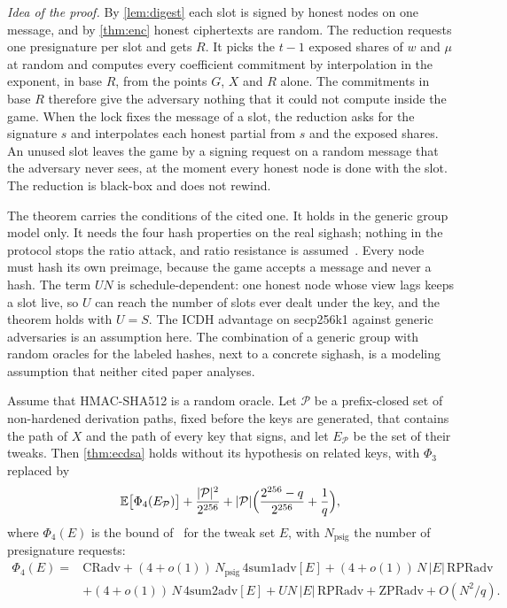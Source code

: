 \emph{Idea of the proof.} By \cref{lem:digest} each slot is signed by honest nodes on one message, and by \cref{thm:enc} honest ciphertexts are random. The reduction requests one presignature per slot and gets $R$. It picks the $t-1$ exposed shares of $w$ and $\mu$ at random and computes every coefficient commitment by interpolation in the exponent, in base $R$, from the points $G$, $X$ and $R$ alone. The commitments in base $R$ therefore give the adversary nothing that it could not compute inside the game. When the lock fixes the message of a slot, the reduction asks for the signature $s$ and interpolates each honest partial from $s$ and the exposed shares. An unused slot leaves the game by a signing request on a random message that the adversary never sees, at the moment every honest node is done with the slot. The reduction is black-box and does not rewind.

The theorem carries the conditions of the cited one. It holds in the generic group model only. It needs the four hash properties on the real sighash; nothing in the protocol stops the ratio attack, and ratio resistance is assumed~\cite[p.~26]{GS21}. Every node must hash its own preimage, because the game accepts a message and never a hash. The term $U N$ is schedule-dependent: one honest node whose view lags keeps a slot live, so $U$ can reach the number of slots ever dealt under the key, and the theorem holds with $U = S$. The ICDH advantage on secp256k1 against generic adversaries is an assumption here. The combination of a generic group with random oracles for the labeled hashes, next to a concrete sighash, is a modeling assumption that neither cited paper analyses.

\begin{corollary}\label{cor:bip32}
Assume that HMAC-SHA512 is a random oracle. Let $\mathcal{P}$ be a prefix-closed set of non-hardened derivation paths, fixed before the keys are generated, that contains the path of $X$ and the path of every key that signs, and let $E_{\mathcal{P}}$ be the set of their tweaks. Then \cref{thm:ecdsa} holds without its hypothesis on related keys, with $\Phi_3$ replaced by
\[
  \mathbb{E}\bigl[\Phi_4(E_{\mathcal{P}})\bigr] + \frac{|\mathcal{P}|^2}{2^{256}} + |\mathcal{P}|\Bigl(\frac{2^{256} - q}{2^{256}} + \frac{1}{q}\Bigr),
\]
where $\Phi_4(E)$ is the bound of~\cite[Theorem~4]{GS21} for the tweak set $E$, with $N_{\mathrm{psig}}$ the number of presignature requests:
\begin{align*}
  \Phi_4(E) ={}& \mathrm{CRadv} + (4 + o(1))\,N_{\mathrm{psig}}\,\mathrm{4sum1adv}[E] + (4 + o(1))\,N\,|E|\,\mathrm{RPRadv} \\
  &+ (4 + o(1))\,N\,\mathrm{4sum2adv}[E] + U N\,|E|\,\mathrm{RPRadv} + \mathrm{ZPRadv} + O(N^2/q) .
\end{align*}
\end{corollary}

